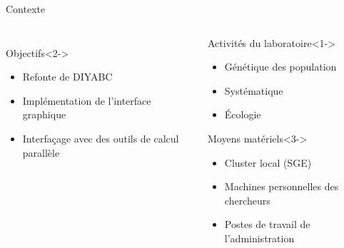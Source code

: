 \documentclass[handout]{beamer}
\begin{document}
\begin{frame}{Contexte}
\begin{columns}
\begin{column}[l]{0.5\linewidth}
\begin{columns}
\begin{column}[r]{0.5\linewidth}
\begin{figure}
        \end{figure}
        \end{column}
        \end{columns}
        \vspace{1cm}
	\begin{block}{Objectifs}<2->
			\begin{itemize}
                \item Refonte de DIYABC
				\item Implémentation de l'interface graphique
                \item Interfaçage avec des outils de calcul parallèle
			\end{itemize}
					
		\end{block}

	\end{column}
	\begin{column}[r]{0.5\linewidth}
	\begin{exampleblock}{Activités du laboratoire}<1->
			\begin{itemize}
				\item Génétique des population
                \item Systématique
                \item Écologie
			\end{itemize}
					
		\end{exampleblock}
	\begin{block}{Moyens matériels}<3->
			\begin{itemize}
                \item Cluster local (SGE)
				\item Machines personnelles des chercheurs
                \item Postes de travail de l'administration
			\end{itemize}
					
		\end{block}
	\end{column}
	\end{columns}
\end{frame}
\end{document}
